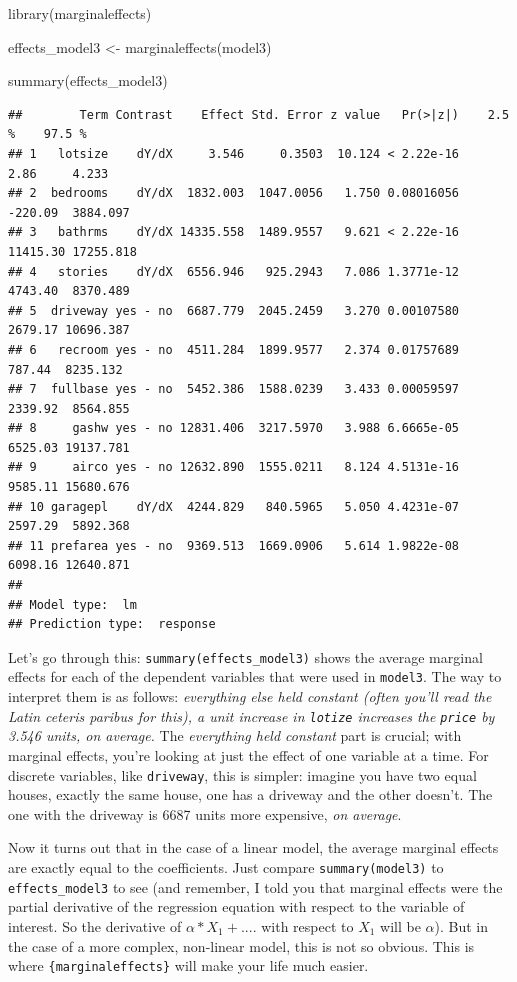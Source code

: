 \documentclass[
]{article}
\newenvironment{Shaded}{\begin{snugshade}}{\end{snugshade}}
\newcommand{\FunctionTok}[1]{\textcolor[rgb]{0.00,0.00,0.00}{#1}}
\newcommand{\NormalTok}[1]{#1}
\newcommand{\OtherTok}[1]{\textcolor[rgb]{0.56,0.35,0.01}{#1}}
\begin{document}
\begin{Shaded}
\begin{Highlighting}[]
\FunctionTok{library}\NormalTok{(marginaleffects)}

\NormalTok{effects\_model3 }\OtherTok{\textless{}{-}} \FunctionTok{marginaleffects}\NormalTok{(model3)}

\FunctionTok{summary}\NormalTok{(effects\_model3)}
\end{Highlighting}
\end{Shaded}

\begin{verbatim}
##        Term Contrast    Effect Std. Error z value   Pr(>|z|)    2.5 %    97.5 %
## 1   lotsize    dY/dX     3.546     0.3503  10.124 < 2.22e-16     2.86     4.233
## 2  bedrooms    dY/dX  1832.003  1047.0056   1.750 0.08016056  -220.09  3884.097
## 3   bathrms    dY/dX 14335.558  1489.9557   9.621 < 2.22e-16 11415.30 17255.818
## 4   stories    dY/dX  6556.946   925.2943   7.086 1.3771e-12  4743.40  8370.489
## 5  driveway yes - no  6687.779  2045.2459   3.270 0.00107580  2679.17 10696.387
## 6   recroom yes - no  4511.284  1899.9577   2.374 0.01757689   787.44  8235.132
## 7  fullbase yes - no  5452.386  1588.0239   3.433 0.00059597  2339.92  8564.855
## 8     gashw yes - no 12831.406  3217.5970   3.988 6.6665e-05  6525.03 19137.781
## 9     airco yes - no 12632.890  1555.0211   8.124 4.5131e-16  9585.11 15680.676
## 10 garagepl    dY/dX  4244.829   840.5965   5.050 4.4231e-07  2597.29  5892.368
## 11 prefarea yes - no  9369.513  1669.0906   5.614 1.9822e-08  6098.16 12640.871
## 
## Model type:  lm 
## Prediction type:  response
\end{verbatim}

Let's go through this: \texttt{summary(effects\_model3)} shows the average marginal effects for each of the dependent
variables that were used in \texttt{model3}. The way to interpret them is as follows:
\emph{everything else held constant (often you'll read the Latin ceteris paribus for this), a unit increase in
\texttt{lotize} increases the \texttt{price} by 3.546 units, on average.}
The \emph{everything held constant} part is crucial; with marginal effects, you're looking at just the effect of
one variable at a time. For discrete variables, like \texttt{driveway}, this is simpler: imagine you have two
equal houses, exactly the same house, one has a driveway and the other doesn't. The one with the driveway
is 6687 units more expensive, \emph{on average}.

Now it turns out that in the case of a linear model, the average marginal effects are exactly equal to the
coefficients. Just compare \texttt{summary(model3)} to \texttt{effects\_model3} to see
(and remember, I told you that marginal effects were the partial derivative of the regression equation with
respect to the variable of interest. So the derivative of \(\alpha*X_1 + ....\) with respect to \(X_1\) will
be \(\alpha\)). But in the case of a more complex, non-linear model, this is not so obvious. This is
where \texttt{\{marginaleffects\}} will make your life much easier.
\end{document}

